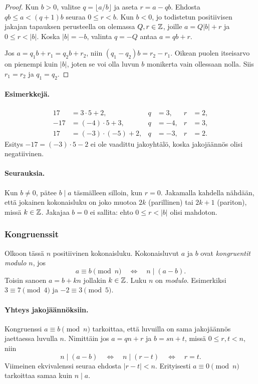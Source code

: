 \documentclass[11pt,a4paper]{amsart}
\begin{document}
\begin{proof}
  Kun $b>0$, valitse $q=\lfloor a/b\rfloor$ ja aseta $r=a-qb$.
  Ehdosta $qb\le a<(q+1)b$ seuraa $0\le r<b$.
  Kun $b<0$, jo todistetun positiivisen jakajan tapauksen perusteella
  on olemassa $Q,r\in\mathbb{Z}$, joille $a=Q|b|+r$ ja $0\le r<|b|$.
  Koska $|b|=-b$, valinta $q=-Q$ antaa $a=qb+r$.

  Jos $a=q_1b+r_1=q_2b+r_2$, niin
  $(q_1-q_2)b=r_2-r_1$. Oikean puolen itseisarvo on pienempi
  kuin $|b|$, joten se voi olla luvun $b$ monikerta vain ollessaan
  nolla. Siis $r_1=r_2$ ja $q_1=q_2$.
\end{proof}

\paragraph{Esimerkkejä.}
\[
  \begin{aligned}
    17 &= 3\cdot 5+2,    & q&=3,  & r&=2,\\
    -17 &= (-4)\cdot 5+3,& q&=-4, & r&=3,\\
    17 &= (-3)\cdot(-5)+2,& q&=-3,& r&=2.
  \end{aligned}
\]
Esitys $-17=(-3)\cdot 5-2$ ei ole vaadittu jakoyhtälö, koska
jakojäännös olisi negatiivinen.

\paragraph{Seurauksia.}
Kun $b\ne 0$, pätee $b\mid a$ täsmälleen silloin, kun $r=0$.
Jakamalla kahdella nähdään, että jokainen kokonaisluku on joko
muotoa $2k$ (parillinen) tai $2k+1$ (pariton), missä $k\in\mathbb{Z}$.
Jakajaa $b=0$ ei sallita: ehto $0\le r<|b|$ olisi mahdoton.

\newpage
\subsubsection{Kongruenssit}

Olkoon tässä $n$ positiivinen kokonaisluku.
Kokonaisluvut $a$ ja $b$ ovat \emph{kongruentit modulo $n$}, jos
\[
  \boxed{a\equiv b\pmod n
  \quad\Longleftrightarrow\quad n\mid(a-b).}
\]
Toisin sanoen $a=b+kn$ jollakin $k\in\mathbb{Z}$.
Luku $n$ on \emph{modulo}.
Esimerkiksi $3\equiv7\pmod4$ ja $-2\equiv3\pmod5$.

\paragraph{Yhteys jakojäännöksiin.}
Kongruenssi $a\equiv b\pmod n$ tarkoittaa, että luvuilla on sama
jakojäännös jaettaessa luvulla $n$. Nimittäin jos
$a=qn+r$ ja $b=sn+t$, missä $0\le r,t<n$, niin
\[
  n\mid(a-b)\quad\Longleftrightarrow\quad n\mid(r-t)
  \quad\Longleftrightarrow\quad r=t.
\]
Viimeinen ekvivalenssi seuraa ehdosta $|r-t|<n$.
Erityisesti $a\equiv0\pmod n$ tarkoittaa samaa kuin $n\mid a$.
\end{document}
